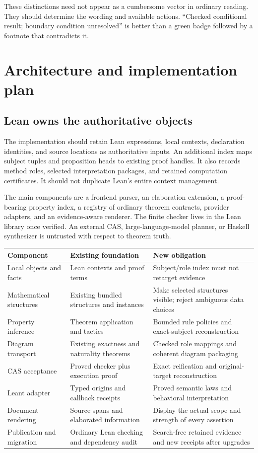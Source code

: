 \documentclass[11pt,a4paper]{article}
\theoremstyle{plain}
\theoremstyle{definition}
\theoremstyle{remark}
\begin{document}
These distinctions need not appear as a cumbersome vector in ordinary reading.
They should determine the wording and available actions. ``Checked conditional
result; boundary condition unresolved'' is better than a green badge followed
by a footnote that contradicts it.

\section{Architecture and implementation plan}
\label{sec:implementation}
\subsection{Lean owns the authoritative objects}
The implementation should retain Lean expressions, local contexts, declaration
identities, and source locations as authoritative inputs. An additional index
maps subject tuples and proposition heads to existing proof handles. It also
records method roles, selected interpretation packages, and retained computation
certificates. It should not duplicate Lean's entire context management.

The main components are a frontend parser, an elaboration extension, a
proof-bearing property index, a registry of ordinary theorem contracts,
provider adapters, and an evidence-aware renderer. The finite checker lives
in the Lean library once verified. An external CAS, large-language-model
planner, or Haskell synthesizer is untrusted with respect to theorem truth.

\begin{center}\small
\begin{tabularx}{\textwidth}{@{}P{37mm}Y Y@{}}
\toprule
Component & Existing foundation & New obligation\\
\midrule
Local objects and facts & Lean contexts and proof terms & Subject/role index must not retarget evidence\\
Mathematical structures & Existing bundled structures and instances & Make selected structures visible; reject ambiguous data choices\\
Property inference & Theorem application and tactics & Bounded rule policies and exact-subject reconstruction\\
Diagram transport & Existing exactness and naturality theorems & Checked role mappings and coherent diagram packaging\\
CAS acceptance & Proved checker plus execution proof & Exact reification and original-target reconstruction\\
Leant adapter & Typed origins and callback receipts & Proved semantic laws and behavioral interpretation\\
Document rendering & Source spans and elaborated information & Display the actual scope and strength of every assertion\\
Publication and migration & Ordinary Lean checking and dependency audit & Search-free retained evidence and new receipts after upgrades\\
\bottomrule
\end{tabularx}
\end{center}
\end{document}
